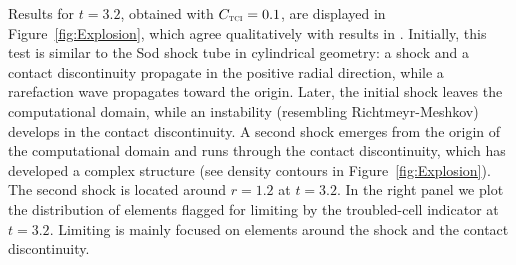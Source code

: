 \documentclass[letterpaper]{jpconf}
\newcommand{\TCI}{\textnormal{\tiny\textsc{TCI}}}
\begin{document}
Results for $t=3.2$, obtained with $C_{\TCI}=0.1$, are displayed in Figure~\ref{fig:Explosion}, which agree qualitatively with results in \cite{liskaWendroff_2003}.  
Initially, this test is similar to the Sod shock tube in cylindrical geometry: a shock and a contact discontinuity propagate in the positive radial direction, while a rarefaction wave propagates toward the origin.  
Later, the initial shock leaves the computational domain, while an instability (resembling Richtmeyr-Meshkov) develops in the contact discontinuity.  
A second shock emerges from the origin of the computational domain and runs through the contact discontinuity, which has developed a complex structure (see density contours in Figure~\ref{fig:Explosion}).  
The second shock is located around $r=1.2$ at $t=3.2$.  
In the right panel we plot the distribution of elements flagged for limiting by the troubled-cell indicator at $t=3.2$.  
Limiting is mainly focused on elements around the shock and the contact discontinuity.  
\end{document}
